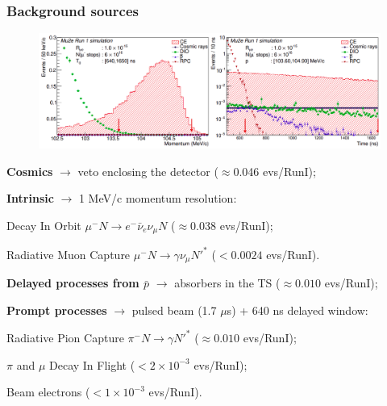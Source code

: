 \documentclass{beamer}
\begin{document}
\begin{frame}
    \frametitle{Background sources}
            \vspace{-3mm} 

         \begin{figure}[h]
            \centering
            \hspace*{-4ex}
            \includegraphics[width=1.\framewidth]{figures/png/Screenshot_20240225_102708.png}
        \end{figure}
        \setlength{\leftmargini}{-0.5em}
        \vspace{-3mm} 
      
    \begin{itemize}
      {\footnotesize
    \item \textbf{Cosmics} $\rightarrow$ veto enclosing the detector {\footnotesize($\approx$0.046 evs/RunI)};   
\item \textbf{Intrinsic} $\rightarrow$ 1 MeV/c momentum resolution:}
\begin{itemize}
    {\footnotesize\item Decay In Orbit $\mu^- N \rightarrow e^- \bar{\nu}_e\nu_\mu N $ {\footnotesize($\approx$0.038 evs/RunI)};
 \item Radiative Muon Capture $\mu^- N \rightarrow\gamma \nu_\mu N'^* $ {\footnotesize($<0.0024$ evs/RunI)}.}
\end{itemize}
{\footnotesize \item \textbf{Delayed processes from $\bar{p}$} $\rightarrow$ absorbers in the TS {\footnotesize($\approx0.010$ evs/RunI)};
\item \textbf{Prompt processes} $\rightarrow$ pulsed beam (1.7 $\mu$s) + 640 ns delayed window:}
\begin{itemize}
    {\footnotesize  \item Radiative Pion Capture $\pi^- N \rightarrow \gamma N' ^*$ {\footnotesize($\approx0.010$ evs/RunI)};
 \item $\pi$ and $\mu$ Decay In Flight {\footnotesize($<2\times 10^{-3}$ evs/RunI)};
 \item Beam electrons {\footnotesize($<1\times 10^{-3}$ evs/RunI)}.}
     \end{itemize}
       
      \end{itemize}
\end{frame}
\end{document}
